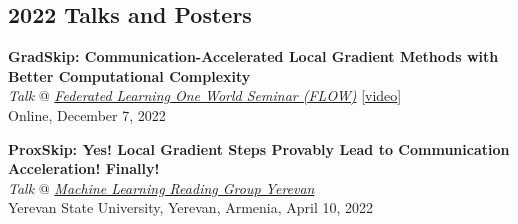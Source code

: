 \documentclass[11pt,a4paper,sans]{moderncv}        %
\begin{document}
\subsection{2022 Talks and Posters}
\begin{etaremune}[resume]
\item \textbf{GradSkip: Communication-Accelerated Local Gradient Methods with Better Computational Complexity}\\
\textit{Talk} @ \textcolor{accent}{\href{https://sites.google.com/view/one-world-seminar-series-flow/archive/2022?authuser=0\#h.99nho9x1b8ju}{\textit{Federated Learning One World Seminar (FLOW)}}} [\textcolor{orange}{\href{https://youtu.be/WWhY5tO-FiM}{video}}]\\
Online, December 7, 2022

\item \textbf{ProxSkip: Yes! Local Gradient Steps Provably Lead to Communication Acceleration! Finally!}\\
\textit{Talk} @ \textcolor{accent}{\href{https://groups.google.com/g/ml-reading-group-yerevan/c/-TZmYEWATuI}{\textit{Machine Learning Reading Group Yerevan}}}\\
Yerevan State University, Yerevan, Armenia, April 10, 2022
\end{etaremune}



\end{document}

